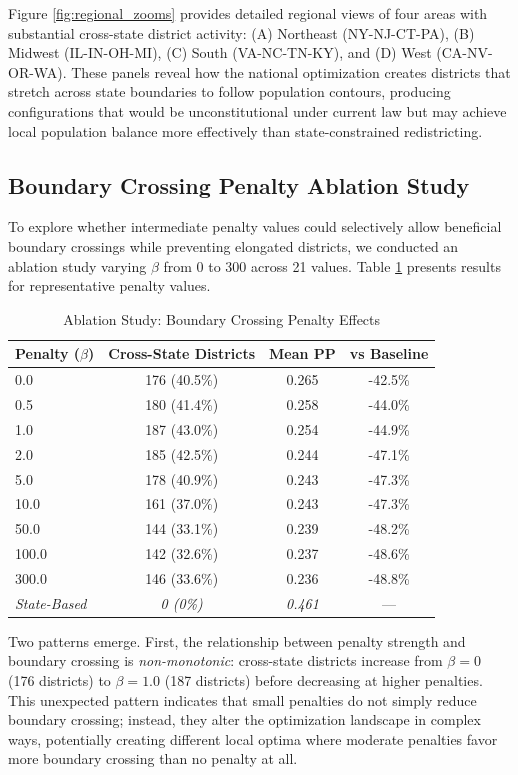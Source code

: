 Figure \ref{fig:regional_zooms} provides detailed regional views of four areas with substantial cross-state district activity: (A) Northeast (NY-NJ-CT-PA), (B) Midwest (IL-IN-OH-MI), (C) South (VA-NC-TN-KY), and (D) West (CA-NV-OR-WA). These panels reveal how the national optimization creates districts that stretch across state boundaries to follow population contours, producing configurations that would be unconstitutional under current law but may achieve local population balance more effectively than state-constrained redistricting.

\subsection{Boundary Crossing Penalty Ablation Study}

To explore whether intermediate penalty values could selectively allow beneficial boundary crossings while preventing elongated districts, we conducted an ablation study varying $ \beta $ from 0 to 300 across 21 values. Table \ref{tab:ablation} presents results for representative penalty values.

\begin{table}[h]
\centering
\caption{Ablation Study: Boundary Crossing Penalty Effects}
\label{tab:ablation}
\begin{tabular}{lccc}
\toprule
\textbf{Penalty ($\beta$)} & \textbf{Cross-State Districts} & \textbf{Mean PP} & \textbf{vs Baseline} \\
\midrule
0.0 & 176 (40.5\%) & 0.265 & -42.5\% \\
0.5 & 180 (41.4\%) & 0.258 & -44.0\% \\
1.0 & 187 (43.0\%) & 0.254 & -44.9\% \\
2.0 & 185 (42.5\%) & 0.244 & -47.1\% \\
5.0 & 178 (40.9\%) & 0.243 & -47.3\% \\
10.0 & 161 (37.0\%) & 0.243 & -47.3\% \\
50.0 & 144 (33.1\%) & 0.239 & -48.2\% \\
100.0 & 142 (32.6\%) & 0.237 & -48.6\% \\
300.0 & 146 (33.6\%) & 0.236 & -48.8\% \\
\midrule
\textit{State-Based} & \textit{0 (0\%)} & \textit{0.461} & --- \\
\bottomrule
\end{tabular}
\end{table}

Two patterns emerge. First, the relationship between penalty strength and boundary crossing is \textit{non-monotonic}: cross-state districts increase from $ \beta = 0 $ (176 districts) to $ \beta = 1.0 $ (187 districts) before decreasing at higher penalties. This unexpected pattern indicates that small penalties do not simply reduce boundary crossing; instead, they alter the optimization landscape in complex ways, potentially creating different local optima where moderate penalties favor more boundary crossing than no penalty at all.

